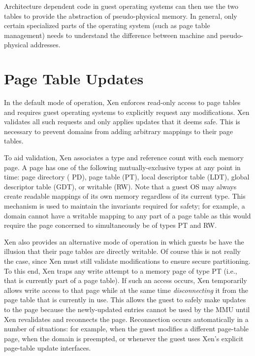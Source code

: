 \documentclass[11pt,twoside,final,openright]{xenstyle}
\begin{document}
Architecture dependent code in guest operating systems can then use
the two tables to provide the abstraction of pseudo-physical
memory. In general, only certain specialized parts of the operating
system (such as page table management) needs to understand the
difference between machine and pseudo-physical addresses.

\section{Page Table Updates}

In the default mode of operation, Xen enforces read-only access to
page tables and requires guest operating systems to explicitly request
any modifications.  Xen validates all such requests and only applies
updates that it deems safe.  This is necessary to prevent domains from
adding arbitrary mappings to their page tables.

To aid validation, Xen associates a type and reference count with each
memory page. A page has one of the following
mutually-exclusive types at any point in time: page directory ({\sf
PD}), page table ({\sf PT}), local descriptor table ({\sf LDT}),
global descriptor table ({\sf GDT}), or writable ({\sf RW}). Note that
a guest OS may always create readable mappings of its own memory 
regardless of its current type. 
This mechanism is used to
maintain the invariants required for safety; for example, a domain
cannot have a writable mapping to any part of a page table as this
would require the page concerned to simultaneously be of types {\sf
  PT} and {\sf RW}.



Xen also provides an alternative mode of operation in which guests be
have the illusion that their page tables are directly writable.  Of
course this is not really the case, since Xen must still validate
modifications to ensure secure partitioning. To this end, Xen traps
any write attempt to a memory page of type {\sf PT} (i.e., that is
currently part of a page table).  If such an access occurs, Xen
temporarily allows write access to that page while at the same time
{\em disconnecting} it from the page table that is currently in
use. This allows the guest to safely make updates to the page because
the newly-updated entries cannot be used by the MMU until Xen
revalidates and reconnects the page.
Reconnection occurs automatically in a number of situations: for
example, when the guest modifies a different page-table page, when the
domain is preempted, or whenever the guest uses Xen's explicit
page-table update interfaces.
\end{document}
